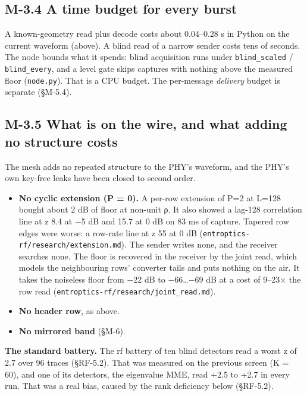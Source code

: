 \documentclass[10pt,letterpaper,twocolumn]{article}
\providecommand{\tightlist}{\setlength{\itemsep}{0pt}\setlength{\parskip}{0pt}}
\begin{document}
\subsection{M-3.4 A time budget for every burst}\label{m-34-a-time-budget-for-every-burst}

A known-geometry read plus decode costs about 0.04--0.28 s in Python on the current waveform (above). A blind read of a narrow sender costs tens of seconds. The node bounds what it spends: blind acquisition runs under \texttt{blind\_\allowbreak{}scaled} / \texttt{blind\_\allowbreak{}every}, and a level gate skips captures with nothing above the measured floor (\texttt{node.\allowbreak{}py}). That is a CPU budget. The per-message \emph{delivery} budget is separate (§M-5.4).

\subsection{M-3.5 What is on the wire, and what adding no structure costs}\label{m-35-what-is-on-the-wire-and-what-adding-no-structure-costs}

The mesh adds no repeated structure to the PHY's waveform, and the PHY's own key-free leaks have been closed to second order.

\begin{itemize}
\tightlist
\item
  \textbf{No cyclic extension (P = 0).} A per-row extension of P=2 at L=128 bought about 2 dB of floor at non-unit ρ. It also showed a lag-128 correlation line at z 8.4 at −5 dB and 15.7 at 0 dB on 83 ms of capture. Tapered row edges were worse: a row-rate line at z 55 at 0 dB (\texttt{entroptics-{}\allowbreak{}rf/\allowbreak{}research/\allowbreak{}extension.\allowbreak{}md}). The sender writes none, and the receiver searches none. The floor is recovered in the receiver by the joint read, which models the neighbouring rows' converter tails and puts nothing on the air. It takes the noiseless floor from −22 dB to −66\ldots−69 dB at a cost of 9--23× the row read (\texttt{entroptics-{}\allowbreak{}rf/\allowbreak{}research/\allowbreak{}joint\_\allowbreak{}read.\allowbreak{}md}).
\item
  \textbf{No header row}, as above.
\item
  \textbf{No mirrored band} (§M-6).
\end{itemize}

\textbf{The standard battery.} The rf battery of ten blind detectors read a worst \textbar z\textbar{} of 2.7 over 96 traces (§RF-5.2). That was measured on the previous screen (K = 60), and one of its detectors, the eigenvalue MME, read +2.5 to +2.7 in every run. That was a real bias, caused by the rank deficiency below (§RF-5.2).
\end{document}
